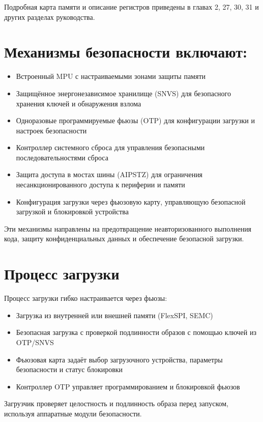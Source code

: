 \documentclass{article}
\begin{document}
Подробная карта памяти и описание регистров приведены в главах 2, 27, 30, 31 и других разделах руководства.

\section{Механизмы безопасности включают:}
\begin{itemize}
    \item Встроенный MPU с настраиваемыми зонами защиты памяти
    \item Защищённое энергонезависимое хранилище (SNVS) для безопасного хранения ключей и обнаружения взлома
    \item Одноразовые программируемые фьюзы (OTP) для конфигурации загрузки и настроек безопасности
    \item Контроллер системного сброса для управления безопасными последовательностями сброса
    \item Защита доступа в мостах шины (AIPSTZ) для ограничения несанкционированного доступа к периферии и памяти
    \item Конфигурация загрузки через фьюзовую карту, управляющую безопасной загрузкой и блокировкой устройства
    \end{itemize}
Эти механизмы направлены на предотвращение неавторизованного выполнения кода, защиту конфиденциальных данных и обеспечение безопасной загрузки.

\section{Процесс загрузки}
Процесс загрузки гибко настраивается через фьюзы:
\begin{itemize}
    \item Загрузка из внутренней или внешней памяти (FlexSPI, SEMC)
    \item Безопасная загрузка с проверкой подлинности образов с помощью ключей из OTP/SNVS
    \item Фьюзовая карта задаёт выбор загрузочного устройства, параметры безопасности и статус блокировки
    \item Контроллер OTP управляет программированием и блокировкой фьюзов
\end{itemize}
Загрузчик проверяет целостность и подлинность образа перед запуском, используя аппаратные модули безопасности.
\end{document}
